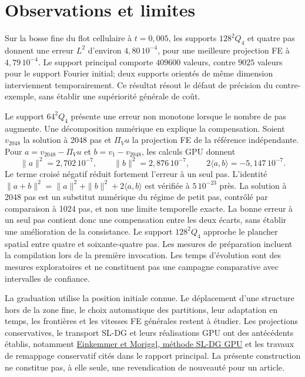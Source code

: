 \documentclass[11pt,a4paper]{article}
\begin{document}
\section{Observations et limites}
Sur la bosse fine du flot cellulaire à $t=0{,}005$, les supports $128^2 Q_4$
et quatre pas donnent une erreur $L^2$ d'environ $4{,}80\,10^{-4}$,
pour une meilleure projection FE à $4{,}79\,10^{-4}$.
Le support principal comporte $409600$ valeurs, contre $9025$ valeurs
pour le support Fourier initial; deux supports orientés de même dimension
interviennent temporairement. Ce résultat résout le défaut de précision
du contre-exemple, sans établir une supériorité générale de coût.

Le support $64^2 Q_4$ présente une erreur non monotone lorsque le nombre
de pas augmente. Une décomposition numérique en explique la compensation.
Soient $v_{2048}$ la solution à 2048 pas et $\Pi_Vu$ la projection FE de la
référence indépendante. Pour $a=v_{2048}-\Pi_Vu$ et $b=v_1-v_{2048}$,
les calculs GPU donnent
\[
 \|a\|^2=2{,}702\,10^{-7},\qquad
 \|b\|^2=2{,}876\,10^{-7},\qquad
 2\langle a,b\rangle=-5{,}147\,10^{-7}.
\]
Le terme croisé négatif réduit fortement l'erreur à un seul pas.
L'identité $\|a+b\|^2=\|a\|^2+\|b\|^2+2\langle a,b\rangle$ est
vérifiée à $5\,10^{-23}$ près. La solution à 2048 pas est un substitut
numérique du régime de petit pas, contrôlé par comparaison à 1024 pas,
et non une limite temporelle exacte. La bonne erreur à un seul pas
contient donc une compensation entre les deux écarts, sans établir
une amélioration de la consistance.
Le support $128^2 Q_4$ approche le plancher spatial entre
quatre et soixante-quatre pas. Les mesures de préparation incluent la
compilation lors de la première invocation. Les temps d'évolution sont
des mesures exploratoires et ne constituent pas une campagne comparative
avec intervalles de confiance.

La graduation utilise la position initiale connue. Le déplacement d'une
structure hors de la zone fine, le choix automatique des partitions,
leur adaptation en temps, les frontières et les vitesses FE générales
restent à étudier. Les projections conservatives, le transport SL-DG et
leurs réalisations GPU ont des antécédents établis, notamment
\href{https://arxiv.org/abs/2212.03036}{Einkemmer et Moriggl, méthode SL-DG GPU}
et les travaux de remappage conservatif cités dans le rapport principal.
La présente construction ne constitue pas, à elle seule, une revendication
de nouveauté pour un article.
\end{document}
